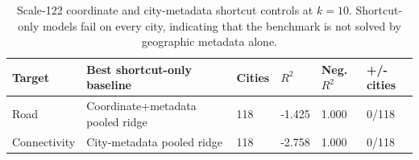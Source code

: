 \begin{table}[t]
\centering
\small
\caption{Scale-122 coordinate and city-metadata shortcut controls at $k=10$. Shortcut-only models fail on every city, indicating that the benchmark is not solved by geographic metadata alone.}
\label{tab:scale122-shortcut-control-v7}
\begin{tabular}{llllll}
\toprule
Target & Best shortcut-only baseline & Cities & $R^2$ & Neg. $R^2$ & +/- cities \\
\midrule
Road & Coordinate+metadata pooled ridge & 118 & -1.425 & 1.000 & 0/118 \\
Connectivity & City-metadata pooled ridge & 118 & -2.758 & 1.000 & 0/118 \\
\bottomrule
\end{tabular}
\end{table}
